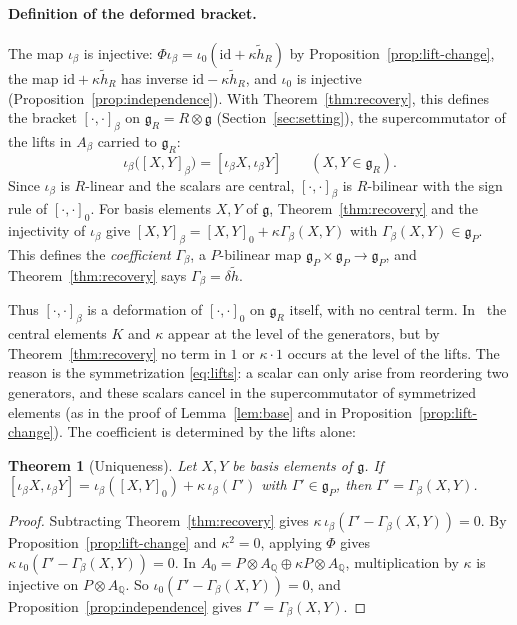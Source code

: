 \documentclass[11pt]{article}
\numberwithin{equation}{section}
\newtheorem{theorem}{Theorem}[section]
\theoremstyle{definition}
\theoremstyle{remark}
\begin{document}
\paragraph{Definition of the deformed bracket.} The map $\iota_\beta$ is injective: $\Phi\iota_\beta=\iota_0(\mathrm{id}+\kappa\tilde h_R)$
by Proposition~\ref{prop:lift-change}, the map $\mathrm{id}+\kappa\tilde h_R$ has inverse
$\mathrm{id}-\kappa\tilde h_R$, and $\iota_0$ is injective (Proposition~\ref{prop:independence}).
With Theorem~\ref{thm:recovery}, this defines the bracket $[\cdot,\cdot]_\beta$ on $\mathfrak g_R=R\otimes\mathfrak g$ (Section~\ref{sec:setting}), the
supercommutator of the lifts in $A_\beta$ carried to $\mathfrak g_R$:
\[
 \iota_\beta\bigl([X,Y]_\beta\bigr)=[\iota_\beta X,\iota_\beta Y]\qquad(X,Y\in\mathfrak g_R).
\]
Since $\iota_\beta$ is $R$-linear and the scalars are central, $[\cdot,\cdot]_\beta$ is $R$-bilinear with the
sign rule of $[\cdot,\cdot]_0$. For basis elements $X,Y$ of $\mathfrak g$,
Theorem~\ref{thm:recovery} and the injectivity of $\iota_\beta$ give
$[X,Y]_\beta=[X,Y]_0+\kappa\Gamma_\beta(X,Y)$ with
$\Gamma_\beta(X,Y)\in\mathfrak g_P$. This defines the \emph{coefficient} $\Gamma_\beta$, a $P$-bilinear
map $\mathfrak g_P\times\mathfrak g_P\to\mathfrak g_P$, and Theorem~\ref{thm:recovery} says
$\Gamma_\beta=\delta\tilde h$.

Thus $[\cdot,\cdot]_\beta$ is a deformation of $[\cdot,\cdot]_0$ on $\mathfrak g_R$ itself, with no central
term. In~\cite{BS17} the central elements $K$ and $\kappa$ appear at the level of the generators, but
by Theorem~\ref{thm:recovery} no term in $1$ or $\kappa\cdot1$ occurs at the level of the lifts.
The reason is the symmetrization \eqref{eq:lifts}: a scalar can only arise from reordering two
generators, and these scalars cancel in the supercommutator of symmetrized elements (as in
the proof of Lemma~\ref{lem:base} and in Proposition~\ref{prop:lift-change}).
The coefficient is determined by the lifts alone:

\begin{theorem}[Uniqueness]\label{thm:unique}
Let $X,Y$ be basis elements of $\mathfrak g$. If $[\iota_\beta X,\iota_\beta Y]=\iota_\beta([X,Y]_0)+\kappa\,\iota_\beta(\Gamma')$ with
$\Gamma'\in\mathfrak g_P$, then $\Gamma'=\Gamma_\beta(X,Y)$.
\end{theorem}

\begin{proof}
Subtracting Theorem~\ref{thm:recovery} gives $\kappa\,\iota_\beta(\Gamma'-\Gamma_\beta(X,Y))=0$.
By Proposition~\ref{prop:lift-change} and $\kappa^2=0$, applying $\Phi$ gives
$\kappa\,\iota_0(\Gamma'-\Gamma_\beta(X,Y))=0$. In $A_0=P\otimes A_{\mathbb Q}\oplus\kappa P\otimes A_{\mathbb Q}$,
multiplication by $\kappa$ is injective on $P\otimes A_{\mathbb Q}$. So
$\iota_0(\Gamma'-\Gamma_\beta(X,Y))=0$, and Proposition~\ref{prop:independence} gives
$\Gamma'=\Gamma_\beta(X,Y)$.
\end{proof}
\end{document}
